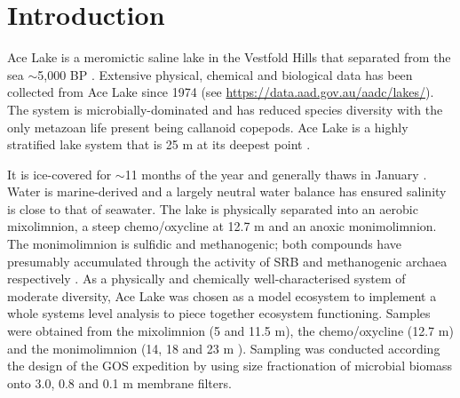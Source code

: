 \section{Introduction}
\acresetall
Ace Lake is a meromictic saline lake in the Vestfold Hills that separated from the sea $\sim$5,000 BP \cite{Bird1991}. 
Extensive physical, chemical and biological data has been collected from Ace Lake since 1974 
(see \url{https://data.aad.gov.au/aadc/lakes/}).
The system is microbially-dominated and has reduced species diversity \cite{Bowman2000b} with the only metazoan life present being callanoid copepods. %
Ace Lake is a highly stratified lake system that is 25 m at its deepest point .

It is ice-covered for $\sim$11 months of the year and generally thaws in January \cite{Rankin1999}.
Water is marine-derived and a largely neutral water balance has ensured salinity is close to that of seawater.
The lake is physically separated into an aerobic mixolimnion, a steep chemo/oxycline at 12.7 m and an anoxic monimolimnion.
The monimolimnion is sulfidic and methanogenic; both compounds have presumably accumulated through the activity of \ac{SRB} and methanogenic archaea respectively \cite{Rankin1999, Lauro2011} .
As a physically and chemically well-characterised system of moderate diversity, Ace Lake was chosen as a model ecosystem to implement a whole systems level analysis to piece together ecosystem functioning.
Samples were obtained from the mixolimnion (5 and 11.5 m), the chemo/oxycline (12.7 m) and the monimolimnion (14, 18 and 23 m ).
Sampling was conducted according the design of the \ac{GOS} expedition \cite{Rusch2007} by using size fractionation of microbial biomass onto 3.0, 0.8 and 0.1 \textmu{}m membrane filters.

